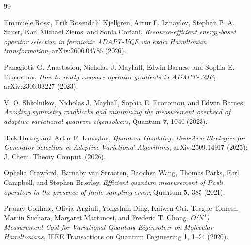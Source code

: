 \documentclass[11pt]{article}
\begin{document}
\begin{thebibliography}{99}

Emanuele Rossi, Erik Rosendahl Kjellgren, Artur F. Izmaylov, Stephan P. A. Sauer, Karl Michael Ziems, and Sonia Coriani,
\textit{Resource-efficient energy-based operator selection in fermionic ADAPT-VQE via exact Hamiltonian transformation},
arXiv:2606.04786 (2026).

Panagiotis G. Anastasiou, Nicholas J. Mayhall, Edwin Barnes, and Sophia E. Economou,
\textit{How to really measure operator gradients in ADAPT-VQE},
arXiv:2306.03227 (2023).

V. O. Shkolnikov, Nicholas J. Mayhall, Sophia E. Economou, and Edwin Barnes,
\textit{Avoiding symmetry roadblocks and minimizing the measurement overhead of adaptive variational quantum eigensolvers},
Quantum \textbf{7}, 1040 (2023).

Rick Huang and Artur F. Izmaylov,
\textit{Quantum Gambling: Best-Arm Strategies for Generator Selection in Adaptive Variational Algorithms},
arXiv:2509.14917 (2025); J. Chem. Theory Comput. (2026).

Ophelia Crawford, Barnaby van Straaten, Daochen Wang, Thomas Parks, Earl Campbell, and Stephen Brierley,
\textit{Efficient quantum measurement of Pauli operators in the presence of finite sampling error},
Quantum \textbf{5}, 385 (2021).

Pranav Gokhale, Olivia Angiuli, Yongshan Ding, Kaiwen Gui, Teague Tomesh, Martin Suchara, Margaret Martonosi, and Frederic T. Chong,
\textit{O($N^3$) Measurement Cost for Variational Quantum Eigensolver on Molecular Hamiltonians},
IEEE Transactions on Quantum Engineering \textbf{1}, 1--24 (2020).

\end{thebibliography}
\end{document}
